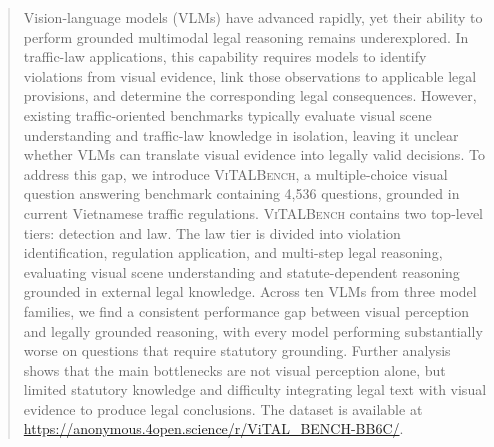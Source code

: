 \begin{abstract}
Vision-language models (VLMs) have advanced rapidly, yet their ability to perform grounded multimodal legal reasoning remains underexplored. In traffic-law applications, this capability requires models to identify violations from visual evidence, link those observations to applicable legal provisions, and determine the corresponding legal consequences. However, existing traffic-oriented benchmarks typically evaluate visual scene understanding and traffic-law knowledge in isolation, leaving it unclear whether VLMs can translate visual evidence into legally valid decisions. To address this gap, we introduce \textsc{ViTALBench}, a multiple-choice visual question answering benchmark containing 4,536 questions, grounded in current Vietnamese traffic regulations.
\textsc{ViTALBench} contains two top-level tiers: detection and law. The law tier is divided into violation identification, regulation application, and multi-step legal reasoning, evaluating visual scene understanding and statute-dependent reasoning grounded in external legal knowledge. Across ten VLMs from three model families, we find a consistent performance gap between visual perception and legally grounded reasoning, with every model performing substantially worse on questions that require statutory grounding. Further analysis shows that the main bottlenecks are not visual perception alone, but limited statutory knowledge and difficulty integrating legal text with visual evidence to produce legal conclusions.
The dataset is available at \url{https://anonymous.4open.science/r/ViTAL_BENCH-BB6C/}.

\end{abstract}
